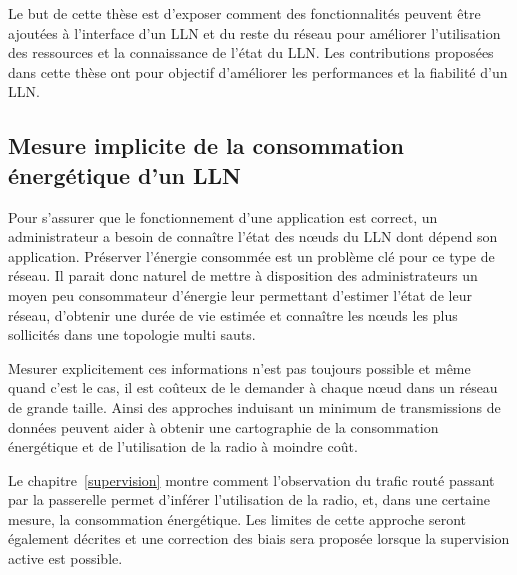 Le but de cette thèse est d'exposer comment des fonctionnalités peuvent être ajoutées à l'interface d'un \ac{LLN} et du reste du réseau pour améliorer l'utilisation des ressources et la connaissance de l'état du \ac{LLN}.
Les contributions proposées dans cette thèse ont pour objectif d'améliorer les performances et la fiabilité d'un \ac{LLN}.


\subsection{Mesure implicite de la consommation énergétique d'un \ac{LLN}}


Pour s'assurer que le fonctionnement d'une application est correct, un administrateur a besoin de connaître l'état des nœuds du \ac{LLN} dont dépend son application.
Préserver l'énergie consommée est un problème clé pour ce type de réseau.
Il parait donc naturel de mettre à disposition des administrateurs un moyen peu consommateur d'énergie leur permettant d'estimer l'état de leur réseau, d'obtenir une durée de vie estimée et connaître les nœuds les plus sollicités dans une topologie multi sauts.


Mesurer explicitement ces informations n'est pas toujours possible et même quand c'est le cas, il est coûteux de le demander à chaque nœud dans un réseau de grande taille.
Ainsi des approches induisant un minimum de transmissions de données peuvent aider à obtenir une cartographie de la consommation énergétique et de l'utilisation de la radio à moindre coût.


Le chapitre~\ref{supervision} montre comment l'observation du trafic routé passant par la passerelle permet d'inférer l'utilisation de la radio, et, dans une certaine mesure, la consommation énergétique.
Les limites de cette approche seront également décrites et une correction des biais sera proposée lorsque la supervision active est possible.

